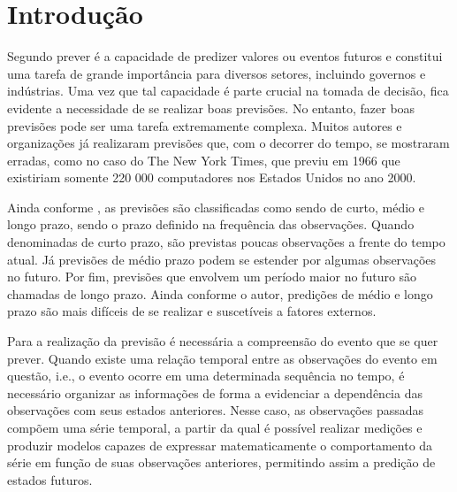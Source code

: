 \documentclass[
    12pt,
    oneside,
    a4paper,
    english,
    brazil
]{abntex2}
\begin{document}
\textual{}

\tableofcontents*
\cleardoublepage{}

\chapter{Introdução}


Segundo  prever é a capacidade de predizer valores ou eventos
futuros e  constitui uma  tarefa de grande  importância para  diversos setores,
incluindo governos e indústrias. Uma vez  que tal capacidade é parte crucial na
tomada de decisão,  fica evidente a necessidade de se  realizar boas previsões.
No entanto,  fazer boas  previsões pode ser  uma tarefa  extremamente complexa.
Muitos autores  e organizações já realizaram  previsões que, com o  decorrer do
tempo, se mostraram erradas, como no caso  do The New York Times, que previu em
1966  que existiriam  somente 220 000  computadores nos  Estados Unidos  no ano
2000.

Ainda conforme  , as  previsões são classificadas  como sendo
de  curto,  médio  e  longo  prazo,   sendo  o  prazo  definido  na  frequência
das  observações.  Quando denominadas  de  curto  prazo, são  previstas  poucas
observações  a frente  do tempo  atual. Já  previsões de  médio prazo  podem se
estender por algumas observações no futuro.  Por fim, previsões que envolvem um
período maior  no futuro são chamadas  de longo prazo. Ainda  conforme o autor,
predições de médio e longo prazo são mais difíceis de se realizar e suscetíveis
a fatores externos.

Para a realização da previsão é necessária  a compreensão do evento que se quer
prever. Quando  existe uma relação temporal  entre as observações do  evento em
questão,  i.e., o  evento  ocorre  em uma  determinada  sequência  no tempo,  é
necessário organizar  as informações  de forma a  evidenciar a  dependência das
observações com  seus estados anteriores.  Nesse caso, as  observações passadas
compõem uma  série temporal, a  partir da qual  é possível realizar  medições e
produzir modelos capazes de expressar  matematicamente o comportamento da série
em  função de  suas  observações  anteriores, permitindo  assim  a predição  de
estados futuros.
\end{document}
